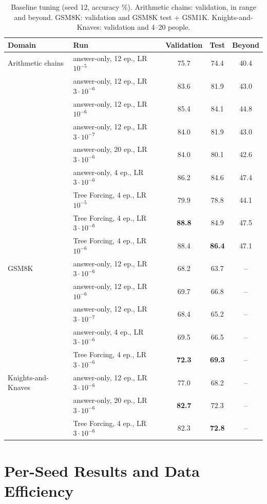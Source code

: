 \documentclass{article}
\newcommand{\tf}{Tree Forcing}
\begin{document}
\begin{table}[h]
\centering
\small
\caption{Baseline tuning (seed 12, accuracy \%). Arithmetic chains: validation, in range and beyond. GSM8K:
validation and GSM8K test + GSM1K. Knights-and-Knaves: validation and 4--20 people.}
\label{tab:tuning}
\begin{tabular}{llccc}
\toprule
Domain & Run & Validation & Test & Beyond \\
\midrule
Arithmetic chains & answer-only, 12 ep., LR $10^{-5}$ & 75.7 & 74.4 & 40.4 \\
& answer-only, 12 ep., LR $3\cdot10^{-6}$ & 83.6 & 81.9 & 43.0 \\
& answer-only, 12 ep., LR $10^{-6}$ & 85.4 & 84.1 & 44.8 \\
& answer-only, 12 ep., LR $3\cdot10^{-7}$ & 84.0 & 81.9 & 43.0 \\
& answer-only, 20 ep., LR $3\cdot10^{-6}$ & 84.0 & 80.1 & 42.6 \\
& answer-only, 4 ep., LR $3\cdot10^{-6}$ & 86.2 & 84.6 & 47.4 \\
& \tf{}, 4 ep., LR $10^{-5}$ & 79.9 & 78.8 & 44.1 \\
& \tf{}, 4 ep., LR $3\cdot10^{-6}$ & \textbf{88.8} & 84.9 & 47.5 \\
& \tf{}, 4 ep., LR $10^{-6}$ & 88.4 & \textbf{86.4} & 47.1 \\
\midrule
GSM8K & answer-only, 12 ep., LR $3\cdot10^{-6}$ & 68.2 & 63.7 & -- \\
& answer-only, 12 ep., LR $10^{-6}$ & 69.7 & 66.8 & -- \\
& answer-only, 12 ep., LR $3\cdot10^{-7}$ & 68.4 & 65.2 & -- \\
& answer-only, 4 ep., LR $3\cdot10^{-6}$ & 69.5 & 66.5 & -- \\
& \tf{}, 4 ep., LR $3\cdot10^{-6}$ & \textbf{72.3} & \textbf{69.3} & -- \\
\midrule
Knights-and-Knaves & answer-only, 12 ep., LR $3\cdot10^{-6}$ & 77.0 & 68.2 & -- \\
& answer-only, 20 ep., LR $3\cdot10^{-6}$ & \textbf{82.7} & 72.3 & -- \\
& \tf{}, 4 ep., LR $3\cdot10^{-6}$ & 82.3 & \textbf{72.8} & -- \\
\bottomrule
\end{tabular}
\end{table}

\section{Per-Seed Results and Data Efficiency}
\label{app:seeds}
\end{document}
